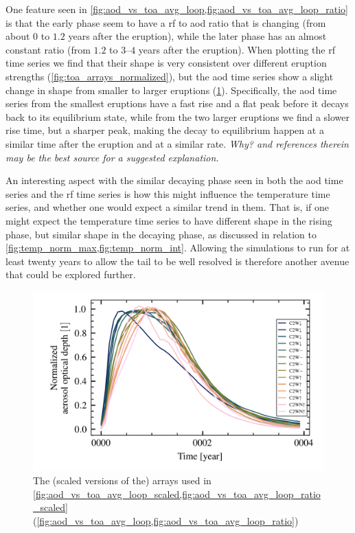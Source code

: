 \documentclass[twocol]{ametsocV5}
\begin{document}
One feature seen in \cref{fig:aod_vs_toa_avg_loop,fig:aod_vs_toa_avg_loop_ratio} is that
the early phase seem to have a \acrshort{rf} to \acrshort{aod} ratio that is changing
(from about \( 0 \) to \( 1.2 \) years after the eruption), while the later phase has an
almost constant ratio (from \( 1.2 \) to \( 3 \)--\( 4 \) years after the eruption).
When plotting the \acrshort{rf} time series we find that their shape is very consistent
over different eruption strengths (\cref{fig:toa_arrays_normalized}), but the
\acrshort{aod} time series show a slight change in shape from smaller to larger
eruptions (\cref{fig:aod_arrays_normalized}). Specifically, the \acrshort{aod} time
series from the smallest eruptions have a fast rise and a flat peak before it decays
back to its equilibrium state, while from the two larger eruptions we find a slower rise
time, but a sharper peak, making the decay to equilibrium happen at a similar time after
the eruption and at a similar rate. \emph{Why? \citet{marshall2019} and references
  therein may be the best source for a suggested explanation.}

An interesting aspect with the similar decaying phase seen in both the \acrshort{aod}
time series and the \acrshort{rf} time series is how this might influence the
temperature time series, and whether one would expect a similar trend in them. That is,
if one might expect the temperature time series to have different shape in the rising
phase, but similar shape in the decaying phase, as discussed in relation to
\cref{fig:temp_norm_max,fig:temp_norm_int}. Allowing the simulations to run for at least
twenty years to allow the tail to be well resolved is therefore another avenue that
could be explored further.

\begin{figure}[t]
  \begin{center}
    \includegraphics[width=0.95\linewidth]{figures/aod_arrays_normalized.png}
  \end{center}
  \caption{
    The (scaled versions of the) arrays used in
    \cref{fig:aod_vs_toa_avg_loop_scaled,fig:aod_vs_toa_avg_loop_ratio_scaled}
    (\cref{fig:aod_vs_toa_avg_loop,fig:aod_vs_toa_avg_loop_ratio})
  }%
  \label{fig:aod_arrays_normalized}
\end{figure}
\end{document}
